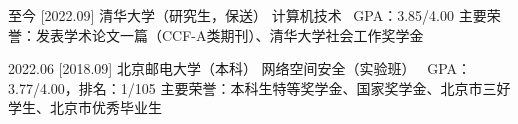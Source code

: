 \documentclass[zh]{resume}
\begin{document}
\makeheader

\begin{educations}
  \education%
    {至今}%
    [2022.09]%
    {清华大学（研究生，保送）}%
    {计算机技术 \textbullet \ GPA：3.85/4.00}%
    {}{主要荣誉：发表学术论文一篇（CCF-A类期刊）、清华大学社会工作奖学金}

  \separator{0.1ex}
  \education%
    {2022.06}%
    [2018.09]%
    {北京邮电大学（本科）}%
    {网络空间安全（实验班） \textbullet \ GPA：3.77/4.00，排名：1/105}%
    {}{主要荣誉：本科生特等奖学金、国家奖学金、北京市三好学生、北京市优秀毕业生}

\end{educations}
\end{document}
